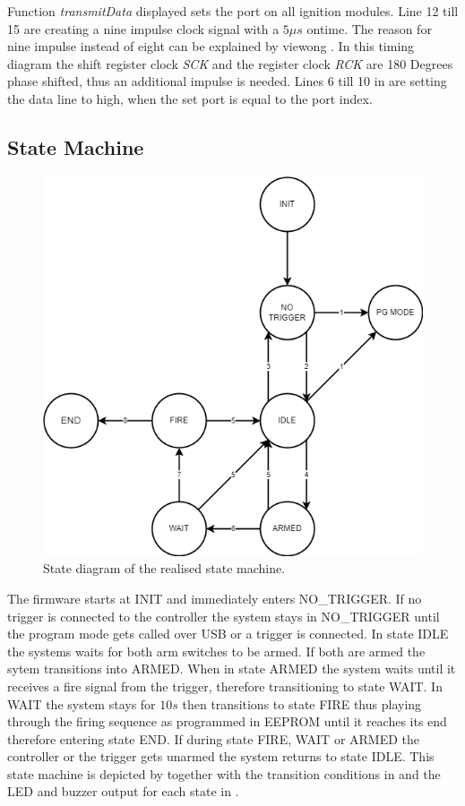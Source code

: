 \noindent Function \textit{transmitData} displayed  sets the port on all ignition modules. Line 12 till 15 are creating a nine impulse clock signal with a $5 \mu s$ ontime. The reason for nine impulse instead of eight can be explained by viewong . In this timing diagram the shift register clock \textit{SCK} and the register clock \textit{RCK} are 180 Degrees phase shifted, thus an additional impulse is needed. Lines 6 till 10 in  are setting the data line to high, when the set port is equal to the port index.


\pagebreak

\subsection{State Machine}
\begin{figure}[!ht]
    \centering
    \includegraphics[width=15cm]{./Figures/fsm.png}
    \caption{State diagram of the realised state machine.}
    \label{fig:state_machine}     
\end{figure}

\noindent The firmware starts at INIT and immediately enters NO\_TRIGGER. If no trigger is connected to the controller the system stays in NO\_TRIGGER until the program mode gets called over USB or a trigger is connected. In state IDLE the systems waits for both arm switches to be armed. If both are armed the sytem transitions into ARMED. When in state ARMED the system waits until it receives a fire signal from the trigger, therefore transitioning to state WAIT. In WAIT the system stays for $10s$ then transitions to state FIRE thus playing through the firing sequence as programmed in EEPROM until it reaches its end therefore entering state END. If during state FIRE, WAIT or ARMED the controller or the trigger gets unarmed the system returns to state IDLE. This state machine is depicted by  together with the transition conditions in  and the LED and buzzer output for each state in .

